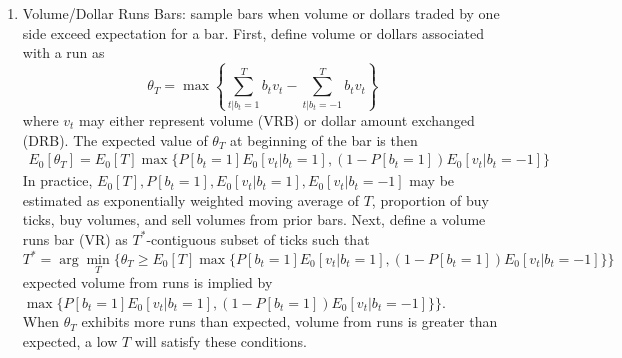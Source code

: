 \documentclass[a4paper,oneside,openany]{book}
\begin{document}
\begin{remark}
\begin{enumerate}[label=\roman*.]
\begin{equation*}
\end{equation*}
The expected value of $\theta_T$ at beginning of bar is computed as
\begin{equation*}
E_0[\theta_T] = E_0[T] \max \{P[b_t = 1], 1 - P[b_t = 1] \} \nonumber
\end{equation*}
In practice, $E_0[T]$ and $P[b_t = 1]$ may be estimated as exponentially weighted moving average of $T$ and proportion of buy ticks from prior bars. Next, define TRB as $T^*$-contiguous subset of ticks such that
\begin{equation*}
T^* = \arg \min_T \{ \theta_T \geq E_0[T] \max \{P[b_t = 1], 1 - P[b_t = 1] \} \} \nonumber
\end{equation*}
where the expected count of ticks from runs is implied by $\max \{P[b_t = 1], 1 - P[b_t = 1] \}$.\\
When $\theta_T$ exhibits more runs than expected, a low $T$ will satisfy these conditions.\\
Instead of measuring length of longest sequence, count number of ticks of each side without offsetting.
\item Volume/Dollar Runs Bars: sample bars when volume or dollars traded by one side exceed expectation for a bar. First, define volume or dollars associated with a run as
\begin{equation*}
\theta_T = \max \left\{ \sum\limits_{t \vert b_t = 1}^T b_t v_t - \sum\limits_{t \vert b_t = -1}^T b_t v_t \right\} \nonumber
\end{equation*}
where $v_t$ may either represent volume (VRB) or dollar amount exchanged (DRB). The expected value of $\theta_T$ at beginning of the bar is then
\begin{align}
E_0 [\theta_T] = E_0[T] \max \{ P[b_t = 1]E_0[v_t \vert b_t = 1], (1 - P[b_t = 1]) E_0[v_t \vert b_t = -1] \} \nonumber
\end{align}
In practice, $E_0[T], P[b_t = 1], E_0[v_t \vert b_t = 1], E_0[v_t \vert b_t = -1]$ may be estimated as exponentially weighted moving average of $T$, proportion of buy ticks, buy volumes, and sell volumes from prior bars. Next, define a volume runs bar (VR) as $T^*$-contiguous subset of ticks such that
\begin{equation*}
T^* = \arg \min_T \{ \theta_T \geq E_0[T] \max \{P[b_t = 1]E_0[v_t \vert b_t = 1], (1 - P[b_t = 1]) E_0[v_t \vert b_t = -1] \} \} \nonumber
\end{equation*}
expected volume from runs is implied by $\max \{P[b_t = 1]E_0[v_t \vert b_t = 1], (1 - P[b_t = 1]) E_0[v_t \vert b_t = -1] \} \}$.\\
When $\theta_T$ exhibits more runs than expected, volume from runs is greater than expected, a low $T$ will satisfy these conditions.
\end{enumerate}
\end{remark}
\end{document}

